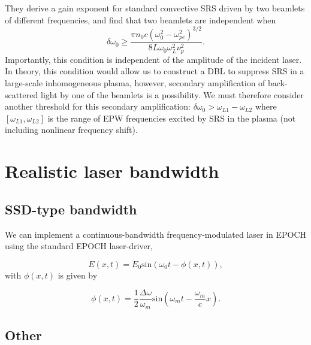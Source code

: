 They derive a gain exponent for standard convective SRS driven by two
beamlets of different frequencies, and find that two beamlets are independent
when
\begin{equation}\label{DLB_threshold_inhomo}
\delta \omega_{0} \geq \frac{\pi n_{0} c\left(\omega_{0}^{2}-\omega_{p
e}^{2}\right)^{3 / 2}}{8 L \omega_{0} \omega_{L}^{2} \nu_{p}^{2}}.
\end{equation}
Importantly, this condition is independent of the amplitude of the incident
laser. In theory, this condition would allow us to construct a DBL to suppress
SRS in a large-scale inhomogeneous plasma, however, secondary amplification of
back-scattered light by one of the beamlets is a possibility. We must therefore
consider another threshold for this secondary amplification: $\delta\omega_0 >
\omega_{L1}-\omega_{L2}$ where $[\omega_{L1},\omega_{L2}]$ is the range of EPW
frequencies excited by SRS in the plasma (not including nonlinear frequency
shift).





\section{Realistic laser bandwidth}
\subsection{SSD-type bandwidth}
We can implement a continuous-bandwidth frequency-modulated laser in EPOCH using the standard EPOCH laser-driver,

\begin{equation}
 	 E(x,t) = E_0\text{sin}\left(\omega_0 t - \phi(x,t)\right),
\end{equation} with $\phi(x,t)$ is given by

\begin{equation}
	\phi(x,t) = \frac{1}{2}\frac{\Delta\omega}{\omega_m}\text{sin}	 	 \left(\omega_mt - \frac{\omega_m}{c}x\right).
\end{equation}
\subsection{Other}

